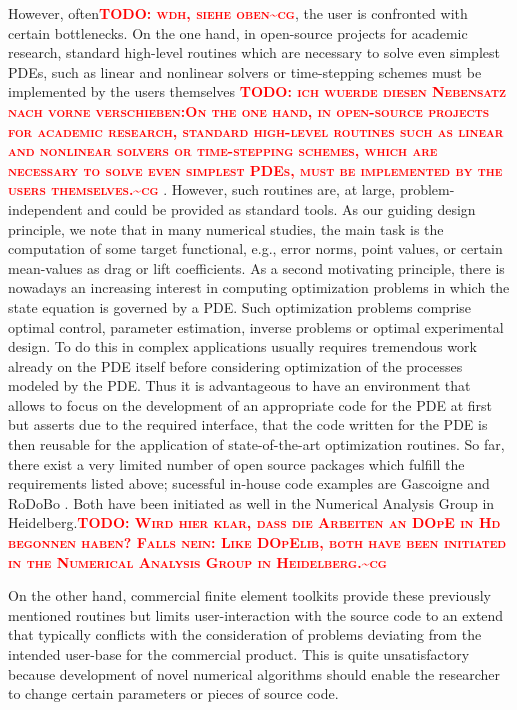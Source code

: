 \documentclass[prodmode,acmtoms]{acmsmall}
\numberwithin{equation}{section}
\newcommand{\todocg}[1]{\textbf{\textsc{\textcolor{red}{TODO: #1\textasciitilde cg}}}}
\begin{document}
However, often\todocg{wdh, siehe oben}, the user is confronted with 
certain bottlenecks. On the one hand, 
in open-source projects for academic research, 
standard high-level routines 
which are necessary to solve even simplest PDEs,
such as linear and nonlinear solvers or time-stepping schemes must be implemented 
by the users themselves \todocg{ich wuerde diesen Nebensatz nach vorne verschieben:On the one hand, 
in open-source projects for academic research, 
standard high-level routines such as linear and nonlinear solvers or time-stepping schemes,
which are necessary to solve even simplest PDEs,
must be implemented by the users themselves.} . However, such routines are, at large,
problem-independent and could be provided as standard tools. 
As our guiding design principle, we note that in many 
numerical studies, the main task is the computation of some  
target functional, e.g., error norms,
point values, or certain mean-values as drag or lift coefficients.
As a second motivating principle, 
there is nowadays an increasing interest in computing 
optimization problems in which the state equation is governed 
by a PDE. Such optimization problems comprise optimal control,
parameter estimation, inverse problems or optimal experimental design. 
To do this in complex applications usually requires tremendous work already
on the PDE itself before considering optimization of the processes modeled 
by the PDE. Thus it is advantageous to have an environment that allows to 
focus on the development of an appropriate code for the PDE at first but 
asserts due to the required interface, that the code written for the PDE
is then reusable for the application of state-of-the-art optimization 
routines.
So far, there exist a very limited number of open source packages
which fulfill the requirements listed above; 
sucessful in-house code examples are Gascoigne \cite{gascoigne}
and RoDoBo \cite{rodobo}. 
Both have been initiated as well in 
the Numerical Analysis Group in Heidelberg.\todocg{Wird hier klar, dass die Arbeiten an DOpE in Hd begonnen haben? Falls nein: Like DOpElib, both have been initiated in the Numerical Analysis Group in Heidelberg.}

On the other hand, commercial finite element toolkits provide these 
previously mentioned routines but limits user-interaction
with the source code to an extend that typically conflicts
with the consideration of problems deviating from the intended 
user-base for the commercial product. 
This is quite unsatisfactory because development of novel numerical 
algorithms should enable the researcher
to change certain parameters or pieces of source code. 
\end{document}
